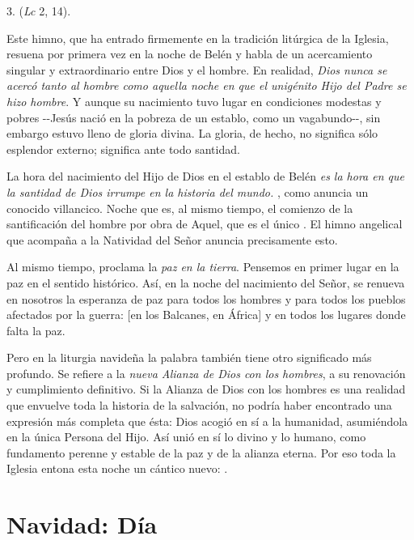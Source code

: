 \begin{body}
\begin{body}
		3.  (\emph{Lc} 2, 14).
		
		Este himno, que ha entrado firmemente en la tradición litúrgica de la Iglesia, resuena por primera vez en la noche de Belén y habla de un acercamiento singular y extraordinario entre Dios y el hombre. En realidad, \emph{Dios nunca se acercó tanto al hombre como aquella noche en que el unigénito Hijo del Padre se hizo hombre}. Y aunque su nacimiento tuvo lugar en condiciones modestas y pobres -\/-Jesús nació en la pobreza de un establo, como un vagabundo-\/-, sin embargo estuvo lleno de gloria divina. La gloria, de hecho, no significa sólo esplendor externo; significa ante todo santidad.
		
		La hora del nacimiento del Hijo de Dios en el establo de Belén \emph{es la hora en que la santidad de Dios irrumpe en la historia del mundo.} , como anuncia un conocido villancico. Noche que es, al mismo tiempo, el comienzo de la santificación del hombre por obra de Aquel, que es el único . El himno angelical que acompaña a la Natividad del Señor anuncia precisamente esto.
		
		Al mismo tiempo, proclama la \emph{paz en la tierra}. Pensemos en primer lugar en la paz en el sentido histórico. Así, en la noche del nacimiento del Señor, se renueva en nosotros la esperanza de paz para todos los hombres y para todos los pueblos afectados por la guerra: {[}en los Balcanes, en África{]} y en todos los lugares donde falta la paz.
		
		Pero en la liturgia navideña la palabra  también tiene otro significado más profundo. Se refiere a la \emph{nueva Alianza de Dios con los hombres}, a su renovación y cumplimiento definitivo. Si la Alianza de Dios con los hombres es una realidad que envuelve toda la historia de la salvación, no podría haber encontrado una expresión más completa que ésta: Dios acogió en sí a la humanidad, asumiéndola en la única Persona del Hijo. Así unió en sí lo divino y lo humano, como fundamento perenne y estable de la paz y de la alianza eterna. Por eso toda la Iglesia entona esta noche un cántico nuevo: .
	\end{body}
	
	\chapter{Navidad: Día}
	

\end{body}
